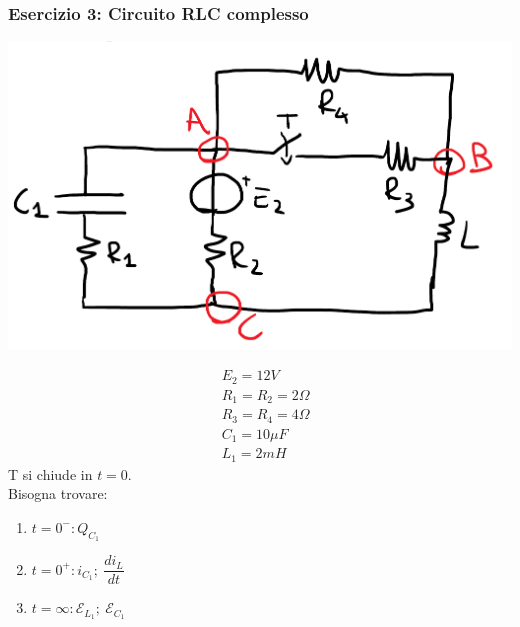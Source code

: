 \documentclass{article}
\begin{document}
\subsubsection{Esercizio 3: Circuito RLC complesso}
\begin{center}
    \includegraphics[scale=0.26]{Image/Es_3_Trans_0.png}
\end{center}
\begin{align*}
    &E_2=12V\\
    &R_1=R_2=2\Omega\\
    &R_3=R_4=4\Omega\\
    &C_1=10\mu F\\
    &L_1=2mH
\end{align*}
T si chiude in $t=0$.
\vspace*{0.2cm}\\
Bisogna trovare:
\begin{enumerate}
    \item $t=0^-:Q_{C_1}$
    \item $t=0^+:i_{C_1}; \ \dfrac{di_L}{dt}$
    \item $t=\infty:\mathcal{E}_{L_1}; \ \mathcal{E}_{C_1}$
\end{enumerate}
\end{document}
